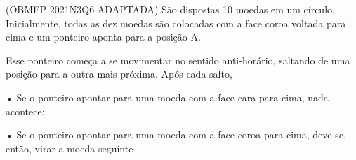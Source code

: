 \documentclass[preview]{standalone}
\begin{document}
\begin{flushleft}
(OBMEP 2021N3Q6 ADAPTADA) São dispostas 10 moedas em um círculo.
Inicialmente, todas as dez moedas são colocadas com a face coroa voltada para cima e um
ponteiro aponta para a posição A. 


 Esse ponteiro começa a se movimentar no sentido anti-horário,
saltando de uma posição para a outra mais próxima. 
Após cada salto,

      • Se o ponteiro apontar para uma moeda
com a face cara para cima, nada acontece;

      • Se o ponteiro apontar para uma moeda
com a face coroa para cima, deve-se, então,
virar a moeda seguinte
\end{flushleft}
\end{document}
